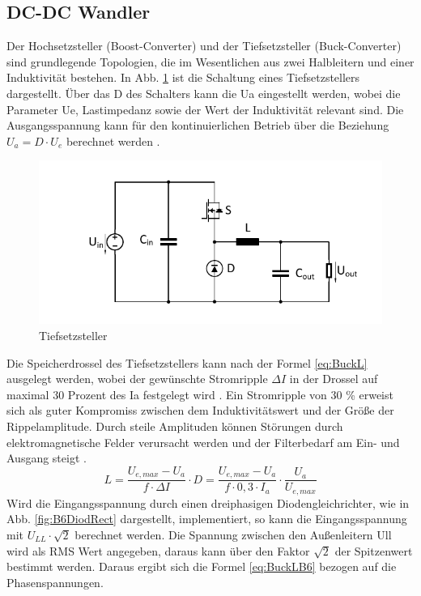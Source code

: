 		\subsection{DC-DC Wandler} \label{sec:Buck}
		Der Hochsetzsteller (Boost-Converter) und der Tiefsetzsteller (Buck-Converter) sind grundlegende Topologien, die im Wesentlichen aus zwei Halbleitern und einer Induktivität bestehen. In Abb. \ref{fig:buck} ist die Schaltung eines Tiefsetzstellers dargestellt. Über das \gls{D} des Schalters kann die \gls{Ua} eingestellt werden, wobei die Parameter \gls{Ue}, Lastimpedanz sowie der Wert der Induktivität relevant sind. Die Ausgangsspannung kann für den kontinuierlichen Betrieb über die Beziehung $U_{a}=D\cdot U_{e} $ berechnet werden \cite{schmidtwalter}.
		\begin{figure} [t]
			\centering
			\includegraphics[width=0.9\linewidth]{content/Grafiken/Buck}
			\caption[Tiefsetzsteller]{Tiefsetzsteller}
			\label{fig:buck}
		\end{figure}
		Die Speicherdrossel des Tiefsetzstellers kann nach der Formel \ref{eq:BuckL} ausgelegt werden, wobei der gewünschte Stromripple $\Delta I $ in der Drossel auf maximal 30 Prozent des \gls{Ia} festgelegt wird \cite{schmidtwalter}. Ein Stromripple von 30 \% erweist sich als guter Kompromiss zwischen dem Induktivitätswert und der Größe der Rippelamplitude. Durch steile Amplituden können Störungen durch elektromagnetische Felder verursacht werden und der Filterbedarf am Ein- und Ausgang steigt \cite{AnalogInductor} \cite{TIBuck}.
		\begin{equation}
			\label{eq:BuckL}
			L=\dfrac{U_{e,max}-U_{a}}{f\cdot \Delta I}\cdot D = \dfrac{U_{e,max}-U_{a}}{f\cdot 0,3 \cdot I_{a}}\cdot \dfrac{U_{a}}{U_{e,max}}
		\end{equation}
		Wird die Eingangsspannung durch einen dreiphasigen Diodengleichrichter, wie in Abb. \ref{fig:B6DiodRect} dargestellt,  implementiert, so kann die Eingangsspannung mit $U_{LL} \cdot \sqrt{2}$ berechnet werden. Die Spannung zwischen den Außenleitern \gls{Ull} wird als \gls{RMS} Wert angegeben, daraus kann über den Faktor $\sqrt{2}$ der Spitzenwert bestimmt werden. Daraus ergibt sich die Formel \ref{eq:BuckLB6} bezogen auf die Phasenspannungen. \\
